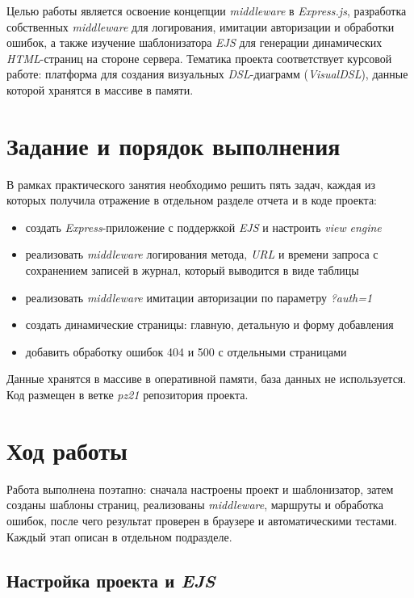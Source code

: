\documentclass[14pt,a4paper]{extarticle}
\begin{document}
Целью работы является освоение концепции \textit{middleware} в \textit{Express.js}, разработка собственных \textit{middleware} для логирования, имитации авторизации и обработки ошибок, а также изучение шаблонизатора \textit{EJS} для генерации динамических \textit{HTML}-страниц на стороне сервера. Тематика проекта соответствует курсовой работе: платформа для создания визуальных \textit{DSL}-диаграмм (\textit{VisualDSL}), данные которой хранятся в массиве в памяти.

\section{Задание и порядок выполнения}

В рамках практического занятия необходимо решить пять задач, каждая из которых получила отражение в отдельном разделе отчета и в коде проекта:

\begin{itemize}
  \item создать \textit{Express}-приложение с поддержкой \textit{EJS} и настроить \textit{view} \textit{engine}
  \item реализовать \textit{middleware} логирования метода, \textit{URL} и времени запроса с сохранением записей в журнал, который выводится в виде таблицы
  \item реализовать \textit{middleware} имитации авторизации по параметру \textit{?auth=1}
  \item создать динамические страницы: главную, детальную и форму добавления
  \item добавить обработку ошибок 404 и 500 с отдельными страницами
\end{itemize}

Данные хранятся в массиве в оперативной памяти, база данных не используется. Код размещен в ветке \textit{pz21} репозитория проекта.

\section{Ход работы}

Работа выполнена поэтапно: сначала настроены проект и шаблонизатор, затем созданы шаблоны страниц, реализованы \textit{middleware}, маршруты и обработка ошибок, после чего результат проверен в браузере и автоматическими тестами. Каждый этап описан в отдельном подразделе.

\subsection{Настройка проекта и \textit{EJS}}
\end{document}
